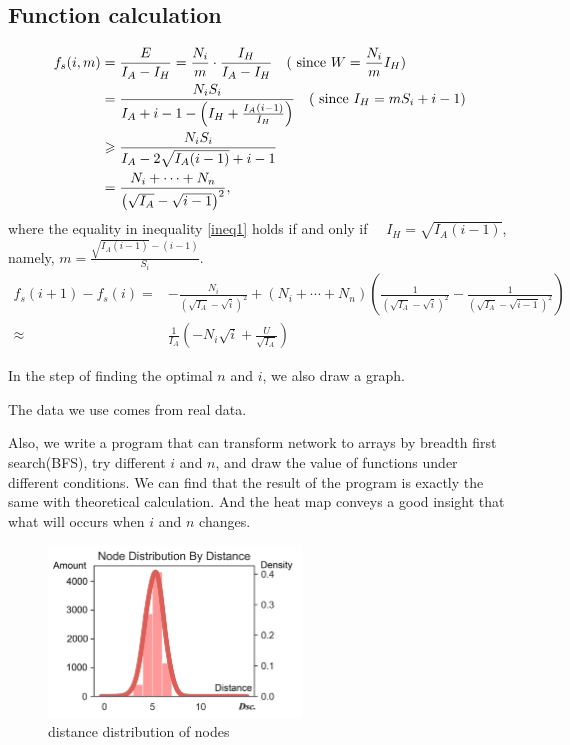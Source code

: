 \documentclass{mcmthesis}
\begin{document}
\subsection{Function calculation}

\begin{align}
    f_{s}(i,m) &=\frac{E}{I_{A}-I_{H}}     =\frac{N_{i}}{m} \cdot \frac{I_{H}}{I_{A}-I_{H}} \quad(\text{ since }  W=\frac{N_{i}}{m} I_{H}) \notag\\
    &=\frac{N_{i} S_{i}}{I_{A}+i-1-\left(I_{H}+\frac{I_{A}(i-1)}{I_{H}}\right)} \quad(\text{ since }   I_{H}=m S_{i} +i-1) \notag \\
    & \geqslant \frac{N_{i} S_{i}}{I_{A}-2 \sqrt{I_{A}(i-1)}+i-1} \label{ineq1}  \\
    & =\frac{N_{i}+\cdots+N_{n}}{\left(\sqrt{I_{A}} -\sqrt{i-1}\right)^{2}}, \notag
    \end{align}
    where the equality  in inequality \eqref{ineq1} holds if and only if 
	$\quad I_{H}=\sqrt{I_{A}(i-1)}$, namely,  $m=\frac{\sqrt{I_{A}(i-1)}-\left(i -1\right)}{S_{i}} $.
	$$
    \begin{aligned}
      f_{s}(i+1)-f_{s}(i)=&-\frac{N_{i}}{\left(\sqrt{I_{A}}-\sqrt{i}\right)^{2}}+\left(N_{i}+\cdots+N_{n}\right)\left(\frac{1}{\left(\sqrt{I_{A}}-\sqrt{i}\right)^{2}}-\frac{1}{\left(\sqrt{I_{A}}-\sqrt{i-1}\right)^{2}}\right)\\
      \approx &  \frac{1}{I_{A}}\left(-N_{i} \sqrt{i}+\frac{U}{\sqrt{I_{A}}}\right)
    \end{aligned}
    $$

	
In the step of finding the optimal $n$ and $i$, we also draw a graph.

The data we use comes from real data.


Also, we write a program that can transform network to arrays by breadth first search(BFS), try different $i$ and $n$, and draw the value of functions under different conditions.
 We can find that the result of the program is exactly the same with theoretical calculation. And the heat map conveys a good insight that what will occurs when $i$ and $n$ changes. 
 


 \begin{figure}[H]
	\centering
	\includegraphics[width = 0.6\textwidth]{figure/hist06.png}
	\caption{distance distribution of nodes}
	\label{fig:1-1}
\end{figure}
\end{document}
